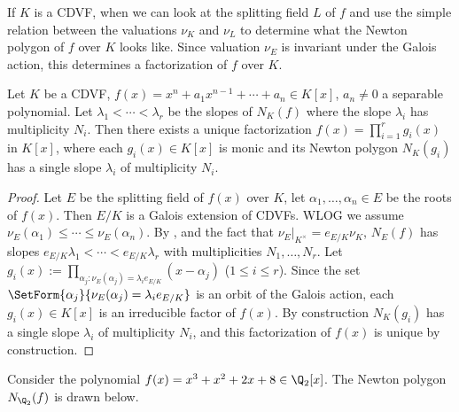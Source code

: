 \documentclass[11pt]{amsart}
\begin{document}
If $K$ is a CDVF, when we can look at the splitting field $L$ of $f$ and use the
simple relation between the valuations $\nu_K$ and $\nu_L$ to determine what the
Newton polygon of $f$ over $K$ looks like.  Since valuation $\nu_E$ is invariant
under the Galois action, this determines a factorization of $f$ over $K$.

\begin{prop}
    Let $K$ be a CDVF, $f(x) = x^n + a_1 x^{n-1} + \cdots + a_n \in K[x]$, $a_n
    \neq 0$ a separable polynomial.  Let $\lambda_1 < \cdots < \lambda_r$ be the
    slopes of $N_K(f)$ where the slope $\lambda_i$ has multiplicity $N_i$.  Then
    there exists a unique factorization $f(x) = \prod_{i=1}^{r} g_i(x)$ in
    $K[x]$, where each $g_i(x) \in K[x]$ is monic and its Newton polygon
    $N_K(g_i)$ has a single slope $\lambda_i$ of multiplicity $N_i$.
\end{prop}

\begin{proof}
    Let $E$ be the splitting field of $f(x)$ over $K$, let $\alpha_1, \ldots,
    \alpha_n \in E$ be the roots of $f(x)$.  Then $E/K$ is a Galois extension of
    CDVFs.  WLOG we assume $\nu_E(\alpha_1) \leq \cdots \leq \nu_E(\alpha_n)$.
    By , and the fact that  $\nu_E|_{K^{\times}}
    = e_{E/K} \nu_K$, $N_E(f)$ has slopes $e_{E/K} \lambda_1 < \cdots < e_{E/K}
    \lambda_r$ with multiplicities $N_1, \ldots, N_r$.  Let $g_i(x) :=
    \prod_{\alpha_j : \nu_E(\alpha_j) = \lambda_i e_{E/K}} (x - \alpha_j)$ ($1
    \leq i \leq r$).
    Since the set $ \SetForm{\alpha_j}{\nu_E(\alpha_j) = \lambda_i e_{E/K}} $ is
    an orbit of the Galois action, each $g_i(x) \in K[x]$ is an irreducible
    factor of $f(x)$.  By construction $N_K(g_i)$ has a single slope $\lambda_i$
    of multiplicity $N_i$, and this factorization of $f(x)$ is unique by
    construction.
\end{proof}

\begin{example}
    Consider the polynomial $f(x) = x^3 + x^2 + 2x + 8 \in \Q_{2}[x]$.  The
    Newton polygon $N_{\Q_2}(f)$ is drawn below.
\end{example}

\begin{center}
\end{center}
\end{document}
